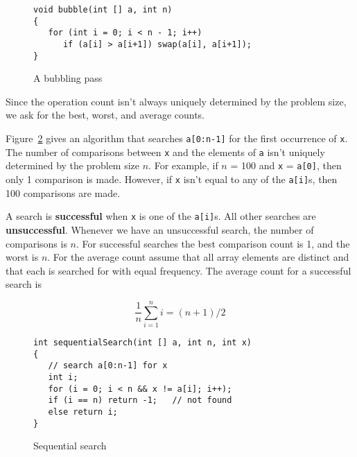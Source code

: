 \begin{figure}
\begin{verbatim}
void bubble(int [] a, int n)
{
   for (int i = 0; i < n - 1; i++)
      if (a[i] > a[i+1]) swap(a[i], a[i+1]);
}
\end{verbatim}
\caption{A bubbling pass
\label{prog2:bubble}}
\end{figure}

Since the operation count isn't always
uniquely determined by the problem size,
we ask for the best, worst, and average counts.
 
\begin{example}
\label{E2:seqsearch}
Figure~\ref{prog2:SeqSearch} gives an algorithm that searches
{\tt a[0:n-1]} for the first occurrence of {\tt x}.
The number of comparisons between {\tt x} and the elements of {\tt a}
isn't uniquely determined by the problem size $n$.
For example, if $n$ = 100
and {\tt x} = {\tt a[0]}, then only 1 comparison is made.  However, if {\tt x}
isn't equal to any of the {\tt a[i]}s, then 100 comparisons are made.
 
A search is {\bf successful}
when {\tt x} is one of the {\tt a[i]}s.  All other
searches are {\bf unsuccessful}.
Whenever we have an unsuccessful search, the number of comparisons is $n$.
For successful searches the best comparison count is 1, and the worst is
$n$.  For the average count assume that all array elements are distinct
and that each is searched for with equal frequency.  The average count
for a successful search is

$$\frac{1}{n} \sum_{i=1}^n i = (n+1)/2$$
\end{example}
 
\begin{figure}
\begin{verbatim}
int sequentialSearch(int [] a, int n, int x)
{
   // search a[0:n-1] for x
   int i;
   for (i = 0; i < n && x != a[i]; i++);
   if (i == n) return -1;   // not found
   else return i;
}
\end{verbatim}
\caption{Sequential search
\label{prog2:SeqSearch}}
\end{figure}

